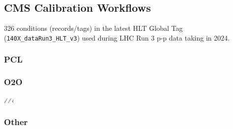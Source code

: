 \subsection{CMS Calibration Workflows}


326 conditions (records/tags) in the latest HLT Global Tag (\texttt{140X\_dataRun3\_HLT\_v3}) used during LHC Run 3 p-p data taking in 2024.


\subsubsection{PCL}
\subsubsection{O2O}

⁄⁄‹\subsubsection{Other}